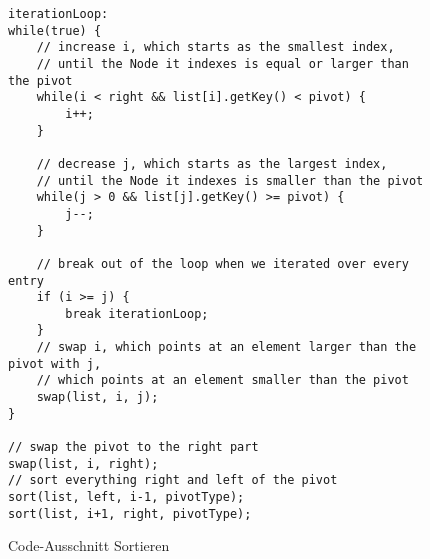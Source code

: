 \documentclass[11pt]{scrartcl}
\begin{document}
\begin{figure}
\begin{verbatim}
iterationLoop:
while(true) {
    // increase i, which starts as the smallest index,
    // until the Node it indexes is equal or larger than the pivot
    while(i < right && list[i].getKey() < pivot) {
        i++;
    }

    // decrease j, which starts as the largest index,
    // until the Node it indexes is smaller than the pivot
    while(j > 0 && list[j].getKey() >= pivot) {
        j--;
    }

    // break out of the loop when we iterated over every entry
    if (i >= j) {
        break iterationLoop;
    }
    // swap i, which points at an element larger than the pivot with j,
    // which points at an element smaller than the pivot
    swap(list, i, j);
}

// swap the pivot to the right part
swap(list, i, right);
// sort everything right and left of the pivot
sort(list, left, i-1, pivotType);
sort(list, i+1, right, pivotType);
\end{verbatim}
\caption{Code-Ausschnitt Sortieren}
\label{figure:sortCode}
\end{figure}
\end{document}
